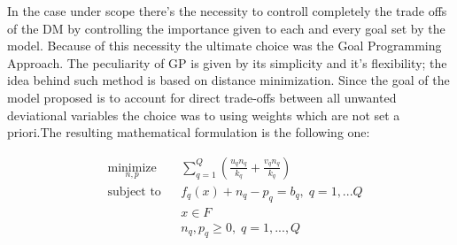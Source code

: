 \documentclass{article}
\begin{document}
In the case under scope there's the necessity to controll completely the trade offs of the DM by controlling the importance given to each and every goal set by the model. Because of this necessity the ultimate choice was the Goal Programming Approach\cite{charnes_optimal_1955}.
The peculiarity of GP is given by its simplicity and it's flexibility\cite{colapinto_multi-criteria_2017}\cite{tamiz_goal_1998}; the idea behind such method is based on distance minimization. Since the goal of the model proposed is to account for direct trade-offs between all unwanted deviational variables the choice was to using weights which are not set a priori.The resulting mathematical formulation is the following one:

\begin{equation*}
\begin{aligned}
& \underset{n,p}{\text{minimize}}
& & \sum_{q=1}^{Q}(\frac{u_q n_q}{k_q}+\frac{v_q n_q}{k_q}) \\
& \text{subject to}
& & f_q(x)+n_q-p_q=b_q, \; q=1,...Q \\
& & & x\in F \\
& & & n_q,p_q\geq 0, \; q=1,...,Q
\end{aligned}
\end{equation*}
\end{document}
